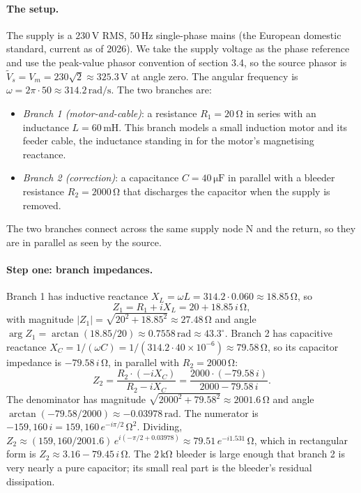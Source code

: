 \paragraph{The setup.} The supply is a $230\,\si{\volt}$ RMS,
$50\,\si{\hertz}$ single-phase mains (the European domestic standard,
current as of 2026). We take the supply voltage as the phase reference
and use the peak-value phasor convention of section 3.4, so the source
phasor is $\tilde V_{s} = V_{m} = 230\sqrt{2} \approx 325.3\,\si{\volt}$
at angle zero. The angular frequency is $\omega = 2\pi \cdot 50 \approx
314.2\,\si{\radian\per\second}$. The two branches are:
\begin{itemize}[leftmargin=*]
  \item \emph{Branch 1 (motor-and-cable)}: a resistance $R_{1} =
    20\,\si{\ohm}$ in series with an inductance $L = 60\,\si{\milli
    \henry}$. This branch models a small induction motor and its
    feeder cable, the inductance standing in for the motor's
    magnetising reactance.
  \item \emph{Branch 2 (correction)}: a capacitance $C = 40\,\si
    {\micro\farad}$ in parallel with a bleeder resistance $R_{2} =
    2000\,\si{\ohm}$ that discharges the capacitor when the supply is
    removed.
\end{itemize}
The two branches connect across the same supply node $\mathrm{N}$ and
the return, so they are in parallel as seen by the source.

\paragraph{Step one: branch impedances.} Branch 1 has inductive
reactance $X_{L} = \omega L = 314.2 \cdot 0.060 \approx 18.85\,\si
{\ohm}$, so
\[
Z_{1} = R_{1} + i X_{L} = 20 + 18.85\,i\,\si{\ohm},
\]
with magnitude $|Z_{1}| = \sqrt{20^{2} + 18.85^{2}} \approx 27.48\,\si
{\ohm}$ and angle $\arg Z_{1} = \arctan(18.85/20) \approx 0.7558\,
\text{rad} \approx 43.3^{\circ}$. Branch 2 has capacitive reactance
$X_{C} = 1/(\omega C) = 1/(314.2 \cdot 40 \times 10^{-6}) \approx
79.58\,\si{\ohm}$, so its capacitor impedance is $-79.58\,i\,\si
{\ohm}$, in parallel with $R_{2} = 2000\,\si{\ohm}$:
\[
Z_{2} = \frac{R_{2} \cdot (-i X_{C})}{R_{2} - i X_{C}}
= \frac{2000 \cdot (-79.58\,i)}{2000 - 79.58\,i}.
\]
The denominator has magnitude $\sqrt{2000^{2} + 79.58^{2}} \approx
2001.6\,\si{\ohm}$ and angle $\arctan(-79.58/2000) \approx -0.03978\,
\text{rad}$. The numerator is $-159{,}160\,i = 159{,}160\,e^{-i\pi/2}\,
\si{\ohm}^{2}$. Dividing, $Z_{2} \approx (159{,}160/2001.6)\,
e^{i(-\pi/2 + 0.03978)} \approx 79.51\,e^{-i1.531}\,\si{\ohm}$, which
in rectangular form is $Z_{2} \approx 3.16 - 79.45\,i\,\si{\ohm}$. The
$2\,\si{\kilo\ohm}$ bleeder is large enough that branch 2 is very
nearly a pure capacitor; its small real part is the bleeder's residual
dissipation.

